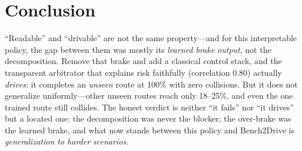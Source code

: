 \documentclass[10pt]{article}
\begin{document}
\section{Conclusion}
``Readable'' and ``drivable'' are not the same property---and for this interpretable policy, the gap
between them was mostly its \emph{learned brake output}, not the decomposition. Remove that brake and
add a classical control stack, and the transparent arbitrator that explains risk faithfully
(correlation 0.80) actually \emph{drives}: it completes an \emph{unseen} route at 100\% with zero
collisions. But it does not generalize uniformly---other unseen routes reach only 18--25\%, and even
the one trained route still collides. The honest verdict is neither ``it fails'' nor ``it drives'' but
a located one: the decomposition was never the blocker; the over-brake was the learned brake, and what
now stands between this policy and Bench2Drive is \emph{generalization to harder scenarios}.



\end{document}
